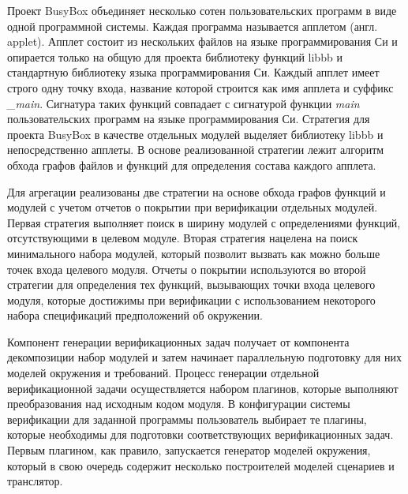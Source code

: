 Проект BusyBox объединяет несколько сотен пользовательских программ в виде одной программной системы.
Каждая программа называется апплетом (англ. applet).
Апплет состоит из нескольких файлов на языке программирования Си и опирается только на общую для проекта библиотеку функций libbb и стандартную библиотеку языка программирования Си.
Каждый апплет имеет строго одну точку входа, название которой строится как имя апплета и суффикс \textit{\_main}.
Сигнатура таких функций совпадает с сигнатурой функции \textit{main} пользовательских программ на языке программирования Си.
Стратегия для проекта BusyBox в качестве отдельных модулей выделяет библиотеку libbb и непосредственно апплеты.
В основе реализованной стратегии лежит алгоритм обхода графов файлов и функций для определения состава каждого апплета.

Для агрегации реализованы две стратегии на основе обхода графов функций и модулей с учетом отчетов о покрытии при верификации отдельных модулей.
Первая стратегия выполняет поиск в ширину модулей с определениями функций, отсутствующими в целевом модуле.
Вторая стратегия нацелена на поиск минимального набора модулей, который позволит вызвать как можно больше точек входа целевого модуля.
Отчеты о покрытии используются во второй стратегии для определения тех функций, вызывающих точки входа целевого модуля, которые достижимы при верификации с использованием некоторого набора спецификаций предположений об окружении.

Компонент генерации верификационных задач получает от компонента декомпозиции набор модулей и затем начинает параллельную подготовку для них моделей окружения и требований.
Процесс генерации отдельной верификационной задачи осуществляется набором плагинов, которые выполняют преобразования над исходным кодом модуля.
В конфигурации системы верификации для заданной программы пользователь выбирает те плагины, которые необходимы для подготовки соответствующих верификационных задач.
Первым плагином, как правило, запускается генератор моделей окружения, который в свою очередь содержит несколько построителей моделей сценариев и транслятор.

